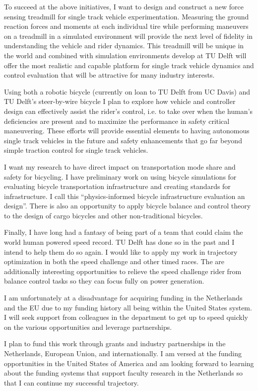 \documentclass{article}
\begin{document}
To succeed at the above initiatives, I want to design and construct a new force
sensing treadmill for single track vehicle experimentation. Measuring the
ground reaction forces and moments at each individual tire while performing
maneuvers on a treadmill in a simulated environment will provide the next level
of fidelity in understanding the vehicle and rider dynamics. This treadmill
will be unique in the world and combined with simulation environments develop
at TU Delft will offer the most realistic and capable platform for single track
vehicle dynamics and control evaluation that will be attractive for many
industry interests.

Using both a robotic bicycle (currently on loan to TU Delft from UC Davis) and
TU Delft's steer-by-wire bicycle I plan to explore how vehicle and controller
design can effectively assist the rider's control, i.e. to take over when the
human's deficiencies are present and to maximize the performance in safety
critical maneuvering. These efforts will provide essential elements to having
autonomous single track vehicles in the future and safety enhancements that go
far beyond simple traction control for single track vehicles.

I want my research to have direct impact on transportation mode share and
safety for bicycling. I have preliminary work on using bicycle simulations for
evaluating bicycle transportation infrastructure and creating standards for
infrastructure. I call this ``physics-informed bicycle infrastructure
evaluation an design''. There is also an opportunity to apply bicycle balance
and control theory to the design of cargo bicycles and other non-traditional
bicycles.

Finally, I have long had a fantasy of being part of a team that could claim the
world human powered speed record. TU Delft has done so in the past and I intend
to help them do so again. I would like to apply my work in trajectory
optimization in both the speed challenge and other timed races. The are
additionally interesting opportunities to relieve the speed challenge rider
from balance control tasks so they can focus fully on power generation.

I am unfortunately at a disadvantage for acquiring funding in the Netherlands
and the EU due to my funding history all being within the United States system.
I will seek support from colleagues in the department to get up to speed
quickly on the various opportunities and leverage partnerships.

I plan to fund this work through grants and industry partnerships in the
Netherlands, European Union, and internationally. I am versed at the funding
opportunities in the United States of America and am looking forward to
learning about the funding systems that support faculty research in the
Netherlands so that I can continue my successful trajectory.




\end{document}
